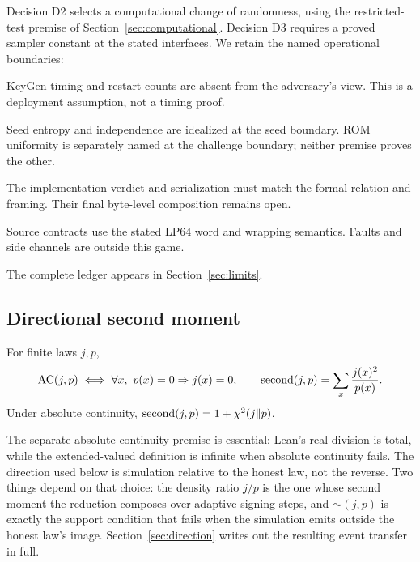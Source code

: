 Decision D2 selects a computational change of randomness, using the
restricted-test premise of Section~\ref{sec:computational}. Decision
D3 requires a proved sampler constant at the stated interfaces.
We retain the named operational boundaries:

\begin{assumption}\label{ass:a1}
KeyGen timing and restart counts are absent from the adversary's view.
This is a deployment assumption, not a timing proof.
\end{assumption}
\begin{assumption}\label{ass:a2}
Seed entropy and independence are idealized at the seed boundary. ROM
uniformity is separately named at the challenge boundary; neither
premise proves the other.
\end{assumption}
\begin{assumption}\label{ass:a34}
The implementation verdict and serialization must match the formal
relation and framing. Their final byte-level composition remains open.
\end{assumption}
\begin{assumption}\label{ass:a5}
Source contracts use the stated LP64 word and wrapping semantics. Faults
and side channels are outside this game.
\end{assumption}
The complete ledger appears in Section~\ref{sec:limits}.

\subsection{Directional second moment}
\begin{definition}%
\label{def:second}
For finite laws $j,p$,
\[
 \operatorname{AC}(j,p)\iff\forall x,\ p(x)=0\Rightarrow j(x)=0,
 \qquad \operatorname{second}(j,p)=\sum_x\frac{j(x)^2}{p(x)}.
\]
Under absolute continuity, $\operatorname{second}(j,p)=1+\chi^2(j\Vert p)$.
\end{definition}
The separate absolute-continuity premise is essential: Lean's real
division is total, while the extended-valued  definition is
infinite when absolute continuity fails. The direction used below is
simulation relative to the honest law, not the reverse. Two things
depend on that choice: the density ratio $j/p$ is the one whose second
moment the reduction composes over adaptive signing steps, and
$\AC(j,p)$ is exactly the support condition that fails when the
simulation emits outside the honest law's image.
Section~\ref{sec:direction} writes out the resulting event transfer in
full.
